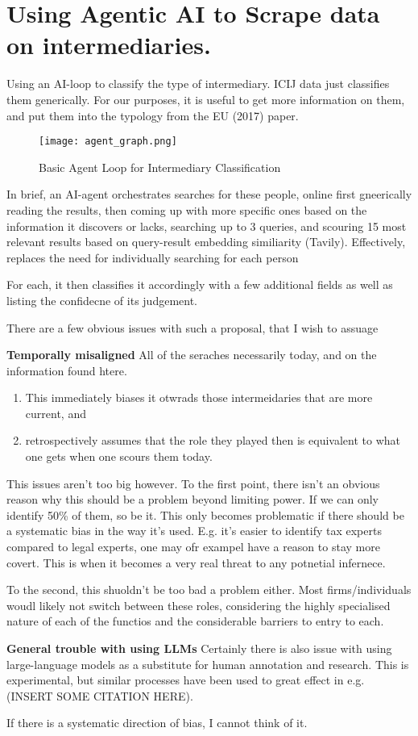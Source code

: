 \section{Using Agentic AI to Scrape data on intermediaries.}
\label{sec:3_3}
Using an AI-loop to classify the type of intermediary.
ICIJ data just classifies them generically. For our purposes, it is useful to get more information on them, and put them into the typology from the EU (2017) paper.

\begin{figure}[htbp]
    \centering
    \texttt{[image: agent\_graph.png]}
    \caption{Basic Agent Loop for Intermediary Classification}
    \label{fig:agent_loop_placeholder}
\end{figure}

In brief, an AI-agent orchestrates searches for these people, online first gneerically reading the results, then coming up with more specific ones based on the information it discovers or lacks, searching up to 3 queries, and scouring 15 most relevant results based on query-result embedding similiarity (Tavily). Effectively, replaces the need for individually searching for each person

For each, it then classifies it accordingly with a few additional fields as well as listing the confidecne of its judgement.

There are a few obvious issues with such a proposal, that I wish to assuage

\textbf{Temporally misaligned}
All of the seraches necessarily today, and on the information found htere.
\begin{enumerate}[label=\arabic*.]
    \item This immediately biases it otwrads those intermeidaries that are more current, and
    \item retrospectively assumes that the role they played then is equivalent to what one gets when one scours them today.
\end{enumerate}
This issues aren't too big however. To the first point, there isn't an obvious reason why this should be a problem beyond limiting power. If we can only identify 50\% of them, so be it. This only becomes problematic if there should be a systematic bias in the way it's used. E.g. it's easier to identify tax experts compared to legal experts, one may ofr exampel have a reason to stay more covert. This is when it becomes a very real threat to any potnetial infernece.

To the second, this shuoldn't be too bad a problem either. Most firms/individuals woudl likely not switch between these roles, considering the highly specialised nature of each of the functios and the considerable barriers to entry to each.

\textbf{General trouble with using LLMs}
Certainly there is also issue with using large-language models as a substitute for human annotation and research. This is experimental, but similar processes have been used to great effect in e.g. (INSERT SOME CITATION HERE).

If there is a systematic direction of bias, I cannot think of it.
